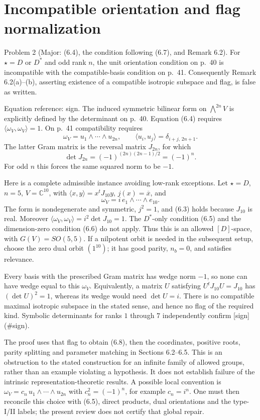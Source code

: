\documentclass[10pt]{article}
\begin{document}
\section*{Incompatible orientation and flag normalization}
Problem 2 (Major: (6.4), the condition following (6.7), and Remark 6.2).  For \(\star=D\) or \(D^*\) and odd rank \(n\), the unit orientation condition on p. 40 is incompatible with the compatible-basis condition on p. 41. Consequently Remark 6.2(a)–(b), asserting existence of a compatible isotropic subspace and flag, is false as written.\par
Equation reference: sign. The induced symmetric bilinear form on \(\bigwedge^{2n}V\) is explicitly defined by the determinant on p. 40. Equation (6.4) requires \(\langle\omega_V,\omega_V\rangle=1\). On p. 41 compatibility requires \[\omega_V=u_1\wedge\cdots\wedge u_{2n},\qquad
 \langle u_i,u_j\rangle=\delta_{i+j,\,2n+1}.\] The latter Gram matrix is the reversal matrix \(J_{2n}\), for which \[
 \det J_{2n}=(-1)^{(2n)(2n-1)/2}=(-1)^n.\] For odd \(n\) this forces the same squared norm to be \(-1\).\par
Here is a complete admissible instance avoiding low-rank exceptions. Let \(\star=D\), \(n=5\), \(V=\mathbb C^{10}\), with \(\langle x,y\rangle=x^tJ_{10}y\), \(j(x)=\overline{x}\), and \[\omega_V=i\,e_1\wedge\cdots\wedge e_{10}.\] The form is nondegenerate and symmetric, \(j^2=1\), and (6.3) holds because \(J_{10}\) is real. Moreover \(\langle\omega_V,\omega_V\rangle=i^2\det J_{10}=1\). The \(D^*\)-only condition (6.5) and the dimension-zero condition (6.6) do not apply. Thus this is an allowed \([D]\)-space, with \(G(V)=SO(5,5)\). If a nilpotent orbit is needed in the subsequent setup, choose the zero dual orbit \((1^{10})\); it has good parity, \(n_b=0\), and satisfies relevance.\par
Every basis with the prescribed Gram matrix has wedge norm \(-1\), so none can have wedge equal to this \(\omega_V\). Equivalently, a matrix \(U\) satisfying \(U^tJ_{10}U=J_{10}\) has \((\det U)^2=1\), whereas its wedge would need \(\det U=i\). There is no compatible maximal isotropic subspace in the stated sense, and hence no flag of the required kind. Symbolic determinants for ranks \(1\) through \(7\) independently confirm [sign] (\#sign).\par
The proof uses that flag to obtain (6.8), then the coordinates, positive roots, parity splitting and parameter matching in Sections 6.2–6.5. This is an obstruction to the stated construction for an infinite family of allowed groups, rather than an example violating a hypothesis. It does not establish failure of the intrinsic representation-theoretic results. A possible local convention is \(\omega_V=c_n\,u_1\wedge\cdots\wedge u_{2n}\) with \(c_n^2=(-1)^n\), for example \(c_n=i^n\). One must then reconcile this choice with (6.5), direct products, dual orientations and the type-I/II labels; the present review does not certify that global repair.\par
\end{document}
